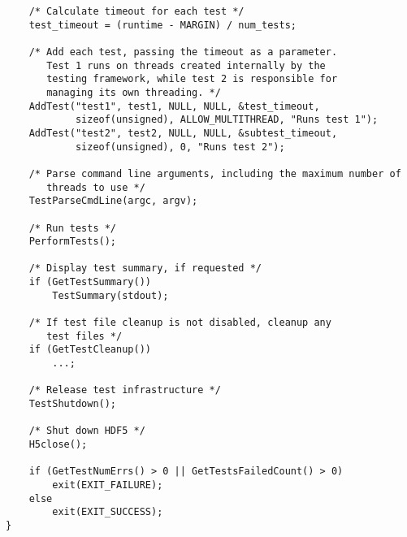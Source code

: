\documentclass[../HDF5_RFC.tex]{subfiles}
\begin{document}
\begin{verbatim}
    /* Calculate timeout for each test */
    test_timeout = (runtime - MARGIN) / num_tests;

    /* Add each test, passing the timeout as a parameter.
       Test 1 runs on threads created internally by the
       testing framework, while test 2 is responsible for
       managing its own threading. */
    AddTest("test1", test1, NULL, NULL, &test_timeout,
            sizeof(unsigned), ALLOW_MULTITHREAD, "Runs test 1");
    AddTest("test2", test2, NULL, NULL, &subtest_timeout,
            sizeof(unsigned), 0, "Runs test 2");

    /* Parse command line arguments, including the maximum number of
       threads to use */
    TestParseCmdLine(argc, argv);

    /* Run tests */
    PerformTests();

    /* Display test summary, if requested */
    if (GetTestSummary())
        TestSummary(stdout);

    /* If test file cleanup is not disabled, cleanup any
       test files */
    if (GetTestCleanup())
        ...;

    /* Release test infrastructure */
    TestShutdown();

    /* Shut down HDF5 */
    H5close();

    if (GetTestNumErrs() > 0 || GetTestsFailedCount() > 0)
        exit(EXIT_FAILURE);
    else
        exit(EXIT_SUCCESS);
}
\end{verbatim}
\end{document}
